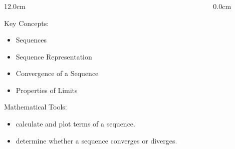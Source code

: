 %

\begin{frame}
\frametitle{\Large {\color[rgb]{0.02,0.20,1.0} }}
\scriptsize
\begin{columns}
\begin{column}{12.0cm}

\vspace{0.6cm}

\begin{block}{Key Concepts:}
\begin{itemize}
	\item[...] Sequences
	\item[...] Sequence Representation
	\item[...] Convergence of a Sequence
	\item[...] Properties of Limits
\end{itemize}
\end{block}

\vspace{0.6cm}

\begin{block}{Mathematical Tools:}
\begin{itemize}
	\item[...] calculate and plot terms of a sequence.
	\item[...] determine whether a sequence converges or diverges.
\end{itemize}
\end{block}

\vspace{1.0cm}

\end{column}
\begin{column}{0.0cm}\end{column}
\end{columns}
\end{frame}

